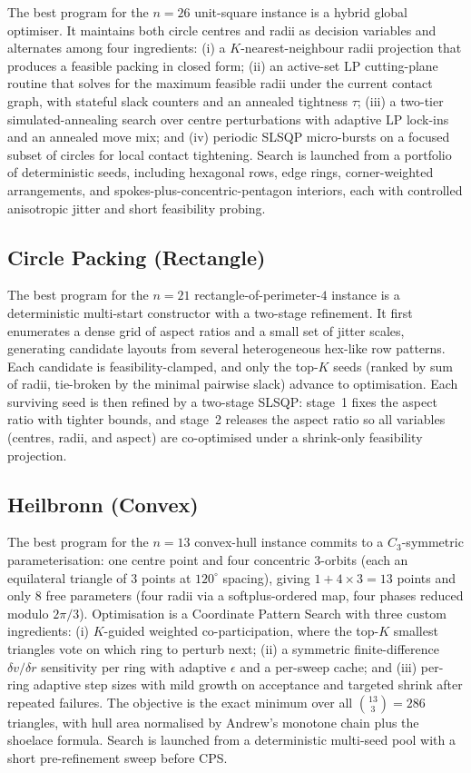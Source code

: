 \documentclass{llmxive}
\begin{document}
The best program for the $n{=}26$ unit-square instance is a hybrid global
optimiser. It maintains both circle centres and radii as decision variables
and alternates among four ingredients: (i) a $K$-nearest-neighbour radii
projection that produces a feasible packing in closed form; (ii) an
active-set LP cutting-plane routine that solves for the maximum feasible
radii under the current contact graph, with stateful slack counters and an
annealed tightness $\tau$; (iii) a two-tier simulated-annealing search over
centre perturbations with adaptive LP lock-ins and an annealed move mix;
and (iv) periodic SLSQP micro-bursts on a focused subset of circles for
local contact tightening. Search is launched from a portfolio of
deterministic seeds, including hexagonal rows, edge rings, corner-weighted
arrangements, and spokes-plus-concentric-pentagon interiors, each with
controlled anisotropic jitter and short feasibility probing.

\subsection{Circle Packing (Rectangle)}
\label{app:program:cprr}

The best program for the $n{=}21$ rectangle-of-perimeter-$4$ instance is a
deterministic multi-start constructor with a two-stage refinement. It first
enumerates a dense grid of aspect ratios and a small set of jitter scales,
generating candidate layouts from several heterogeneous hex-like row
patterns. Each candidate is feasibility-clamped, and only the top-$K$ seeds
(ranked by sum of radii, tie-broken by the minimal pairwise slack) advance
to optimisation. Each surviving seed is then refined by a two-stage SLSQP:
stage~1 fixes the aspect ratio with tighter bounds, and stage~2 releases the
aspect ratio so all variables (centres, radii, and aspect) are co-optimised
under a shrink-only feasibility projection.

\subsection{Heilbronn (Convex)}
\label{app:program:h13}

The best program for the $n{=}13$ convex-hull instance commits to a
$C_3$-symmetric parameterisation: one centre point and four concentric
$3$-orbits (each an equilateral triangle of $3$ points at $120^{\circ}$
spacing), giving $1{+}4{\times}3=13$ points and only $8$ free parameters
(four radii via a softplus-ordered map, four phases reduced modulo
$2\pi/3$). Optimisation is a Coordinate Pattern Search with three custom
ingredients: (i) $K$-guided weighted co-participation, where the top-$K$
smallest triangles vote on which ring to perturb next; (ii) a symmetric
finite-difference $\delta v / \delta r$ sensitivity per ring with adaptive
$\epsilon$ and a per-sweep cache; and (iii) per-ring adaptive step sizes
with mild growth on acceptance and targeted shrink after repeated failures.
The objective is the exact minimum over all $\binom{13}{3}=286$ triangles,
with hull area normalised by Andrew's monotone chain plus the shoelace
formula. Search is launched from a deterministic multi-seed pool with a
short pre-refinement sweep before CPS.
\end{document}
